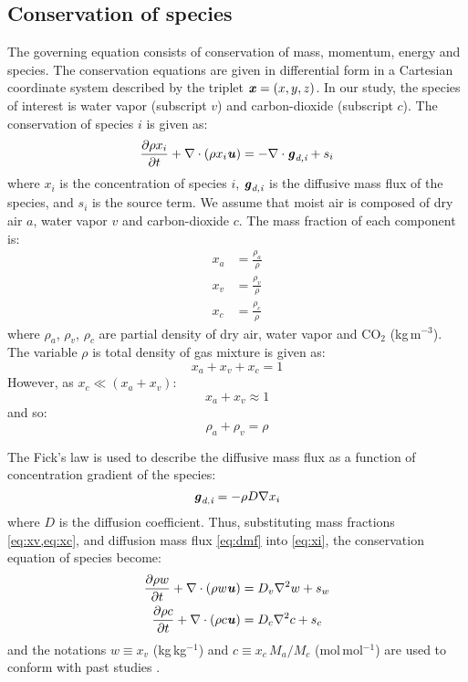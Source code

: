 \subsection*{Conservation of species}
The governing equation consists of conservation of mass, momentum, energy and species. The conservation equations are given in differential form in a Cartesian coordinate system described by the triplet $\textbf{\textit{x}} = (x,y,z)$. In our study, the species of interest is water vapor (subscript $v$) and carbon-dioxide (subscript $c$). The conservation of species $i$ is given as:
\begin{equation}
\frac{\partial \rho x_i}{\partial t} + \nabla  \cdot \left( \rho x_i \textbf{\textit{u}} \right) = - \nabla \cdot \textbf{\textit{g}}_{\textit{d,i}} + s_i
\label{eq:xi}
\end{equation}
where $x_i$ is the concentration of species $i$, $\textbf{\textit{g}}_{\textit{d,i}}$ is the diffusive mass flux of the species, and $s_i$ is the source term. We assume that moist air is composed of dry air $a$, water vapor $v$ and carbon-dioxide $c$. The mass fraction of each component is:
\begin{align}
x_a &= \frac{\rho_a}{\rho} \\
x_v &= \frac{\rho_v}{\rho} \label{eq:xv}\\
x_c &= \frac{\rho_c}{\rho}\label{eq:xc}
\end{align}
where $\rho_a$, $\rho_v$, $\rho_c$ are partial density of dry air, water vapor and CO$_2$ (kg\,m$^{-3}$). The variable $\rho$ is total density of gas mixture is given as:
\begin{equation}
x_a + x_v + x_c = 1
\end{equation}
However, as $x_c \ll (x_a+x_v)$:
\begin{equation}
x_a + x_v \approx 1
\end{equation}
and so:
\begin{equation}
\rho_a + \rho_v = \rho
\end{equation} 

The Fick's law is used to describe the diffusive mass flux as a function of concentration gradient of the species:
\begin{equation}
\textbf{\textit{g}}_{\textit{d,i}} = - \rho D \nabla x_i
\label{eq:dmf}
\end{equation}
where $D$ is the diffusion coefficient. Thus, substituting mass fractions \cref{eq:xv,eq:xc}, and diffusion mass flux \cref{eq:dmf} into \cref{eq:xi}, the conservation equation of species become:
\begin{align}
\frac{\partial \rho w}{\partial t} + \nabla  \cdot \left( \rho w \textbf{\textit{u}} \right) &= D_v \nabla^2 w + s_w \label{eq:xv2}\\
\frac{\partial \rho c}{\partial t} + \nabla  \cdot \left( \rho c \textbf{\textit{u}} \right) &= D_c \nabla^2 c + s_c \label{eq:xc2}
\end{align}
and the notations $w\equiv x_v$ (kg\,kg$^{-1}$) and $c\equiv x_c\, M_a/M_c $ (mol\,mol$^{-1}$) are used to conform with past studies \citep{Carmeliet2005, Defraeye2011, Saneinejad2013, Kubilay2014b}.


